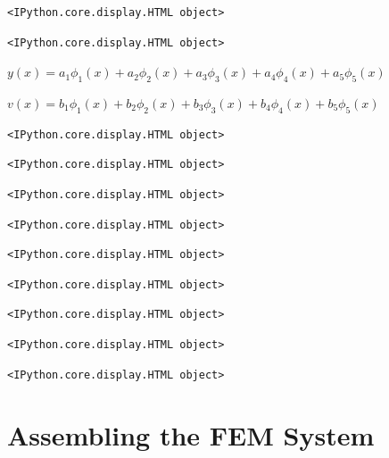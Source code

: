 \documentclass[
  11pt,
  a4paper,
]{scrbook}
\begin{document}
\begin{verbatim}
<IPython.core.display.HTML object>
\end{verbatim}

\begin{verbatim}
<IPython.core.display.HTML object>
\end{verbatim}

$\displaystyle y{\left(x \right)} = a_{1} \phi_{1}{\left(x \right)} + a_{2} \phi_{2}{\left(x \right)} + a_{3} \phi_{3}{\left(x \right)} + a_{4} \phi_{4}{\left(x \right)} + a_{5} \phi_{5}{\left(x \right)}$

$\displaystyle v{\left(x \right)} = b_{1} \phi_{1}{\left(x \right)} + b_{2} \phi_{2}{\left(x \right)} + b_{3} \phi_{3}{\left(x \right)} + b_{4} \phi_{4}{\left(x \right)} + b_{5} \phi_{5}{\left(x \right)}$

\begin{verbatim}
<IPython.core.display.HTML object>
\end{verbatim}

\begin{verbatim}
<IPython.core.display.HTML object>
\end{verbatim}

\begin{verbatim}
<IPython.core.display.HTML object>
\end{verbatim}

\begin{verbatim}
<IPython.core.display.HTML object>
\end{verbatim}

\begin{verbatim}
<IPython.core.display.HTML object>
\end{verbatim}

\begin{verbatim}
<IPython.core.display.HTML object>
\end{verbatim}

\begin{verbatim}
<IPython.core.display.HTML object>
\end{verbatim}

\begin{verbatim}
<IPython.core.display.HTML object>
\end{verbatim}

\begin{verbatim}
<IPython.core.display.HTML object>
\end{verbatim}

\section{Assembling the FEM System}\label{assembling-the-fem-system}
\end{document}
